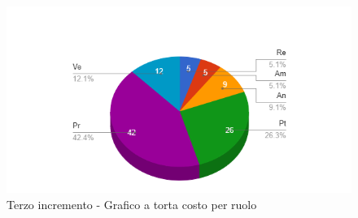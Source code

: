 {{\begin{longtable}{C{.4\freewidth} C{.2\freewidth} C{.2\freewidth} C{.2\freewidth} C{.2\freewidth} C{.2\freewidth} C{.2\freewidth} C{.2\freewidth} C{.2\freewidth}}
        \end{longtable}
        \begin{figure}[H]
          \includegraphics[width=15cm]{sezioni/images/terzoT.png}
          \centering
          \caption{Terzo incremento - Grafico a torta costo per ruolo}
       \end{figure}
    }
    }

